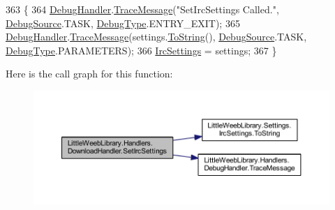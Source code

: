 \begin{DoxyCode}
363         \{
364             \mbox{\hyperlink{class_little_weeb_library_1_1_handlers_1_1_download_handler_a9f1aedadbd6f343d8de1c54724eca11e}{DebugHandler}}.\mbox{\hyperlink{interface_little_weeb_library_1_1_handlers_1_1_i_debug_handler_a2e405bc3492e683cd3702fae125221bc}{TraceMessage}}(\textcolor{stringliteral}{"SetIrcSettings Called."}, 
      \mbox{\hyperlink{namespace_little_weeb_library_1_1_handlers_a2a6ca0775121c9c503d58aa254d292be}{DebugSource}}.TASK, \mbox{\hyperlink{namespace_little_weeb_library_1_1_handlers_ab66019ed40462876ec4e61bb3ccb0a62}{DebugType}}.ENTRY\_EXIT);
365             \mbox{\hyperlink{class_little_weeb_library_1_1_handlers_1_1_download_handler_a9f1aedadbd6f343d8de1c54724eca11e}{DebugHandler}}.\mbox{\hyperlink{interface_little_weeb_library_1_1_handlers_1_1_i_debug_handler_a2e405bc3492e683cd3702fae125221bc}{TraceMessage}}(settings.\mbox{\hyperlink{class_little_weeb_library_1_1_settings_1_1_irc_settings_a2e1d7f26d7d3083d19c3a9e6c6c2d0b2}{ToString}}(), 
      \mbox{\hyperlink{namespace_little_weeb_library_1_1_handlers_a2a6ca0775121c9c503d58aa254d292be}{DebugSource}}.TASK, \mbox{\hyperlink{namespace_little_weeb_library_1_1_handlers_ab66019ed40462876ec4e61bb3ccb0a62}{DebugType}}.PARAMETERS);
366             \mbox{\hyperlink{class_little_weeb_library_1_1_settings_1_1_irc_settings}{IrcSettings}} = settings;
367         \}
\end{DoxyCode}
Here is the call graph for this function\+:\nopagebreak
\begin{figure}[H]
\begin{center}
\leavevmode
\includegraphics[width=350pt]{class_little_weeb_library_1_1_handlers_1_1_download_handler_a6edcb9be7543c9fb587df06c994f50fb_cgraph}
\end{center}
\end{figure}
\mbox{\label{class_little_weeb_library_1_1_handlers_1_1_download_handler_a0ad546188f5b5145dd9b088852cd29f8}} 
